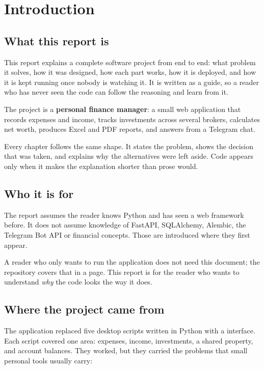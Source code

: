 \chapter{Introduction}

\section{What this report is}

This report explains a complete software project from end to end: what problem
it solves, how it was designed, how each part works, how it is deployed, and how
it is kept running once nobody is watching it. It is written as a guide, so a
reader who has never seen the code can follow the reasoning and learn from it.

The project is a \textbf{personal finance manager}: a small web application that
records expenses and income, tracks investments across several brokers,
calculates net worth, produces Excel and PDF reports, and answers from a
Telegram chat.

Every chapter follows the same shape. It states the problem, shows the decision
that was taken, and explains why the alternatives were left aside. Code appears
only when it makes the explanation shorter than prose would.

\section{Who it is for}

The report assumes the reader knows Python and has seen a web framework before.
It does not assume knowledge of FastAPI, SQLAlchemy, Alembic, the Telegram Bot
API or financial concepts. Those are introduced where they first appear.

A reader who only wants to run the application does not need this document; the
repository  covers that in a page. This report is for the reader
who wants to understand \emph{why} the code looks the way it does.

\section{Where the project came from}

The application replaced five desktop scripts written in Python with a
 interface. Each script covered one area: expenses, income,
investments, a shared property, and account balances. They worked, but they
carried the problems that small personal tools usually carry:

